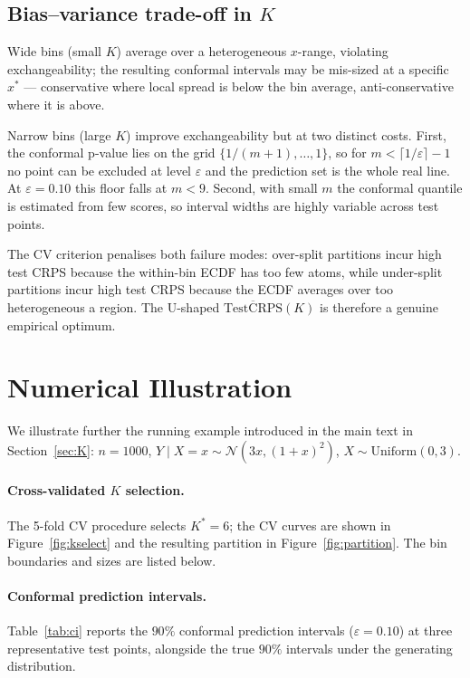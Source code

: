 \documentclass[11pt]{article}
\begin{document}
\subsection*{Bias--variance trade-off in $K$}

Wide bins (small $K$) average over a heterogeneous $x$-range, violating
exchangeability; the resulting conformal intervals may be mis-sized at a
specific $x^*$ --- conservative where local spread is below the bin average,
anti-conservative where it is above.

Narrow bins (large $K$) improve exchangeability but at two distinct costs.
First, the conformal p-value lies on the grid $\{1/(m+1),\ldots,1\}$,
so for $m < \lceil 1/\varepsilon\rceil - 1$ no point can be excluded at level
$\varepsilon$ and the prediction set is the whole real line.
At $\varepsilon=0.10$ this floor falls at $m < 9$.
Second, with small $m$ the conformal quantile is estimated from few scores,
so interval widths are highly variable across test points.

The CV criterion penalises both failure modes:
over-split partitions incur high test CRPS because the within-bin ECDF has too few
atoms, while under-split partitions incur high test CRPS because the ECDF averages
over too heterogeneous a region.
The U-shaped $\overline{\mathrm{TestCRPS}}(K)$ is therefore a genuine empirical optimum.

\section{Numerical Illustration}
\label{app:example}

We illustrate further the running example introduced in the main text in Section~\ref{sec:K}:
$n = 1000$,
$Y \mid X = x \sim \mathcal{N}(3x,(1+x)^2)$, $X \sim \mathrm{Uniform}(0,3)$.

\paragraph{Cross-validated $K$ selection.}
The 5-fold CV procedure selects $K^* = 6$; the CV curves are shown in
Figure~\ref{fig:kselect} and the resulting partition in Figure~\ref{fig:partition}.
The bin boundaries and sizes are listed below.

\paragraph{Conformal prediction intervals.}
Table~\ref{tab:ci} reports the $90\%$ conformal prediction intervals
($\varepsilon = 0.10$) at three representative test points, alongside the true $90\%$
intervals under the generating distribution.
\end{document}
